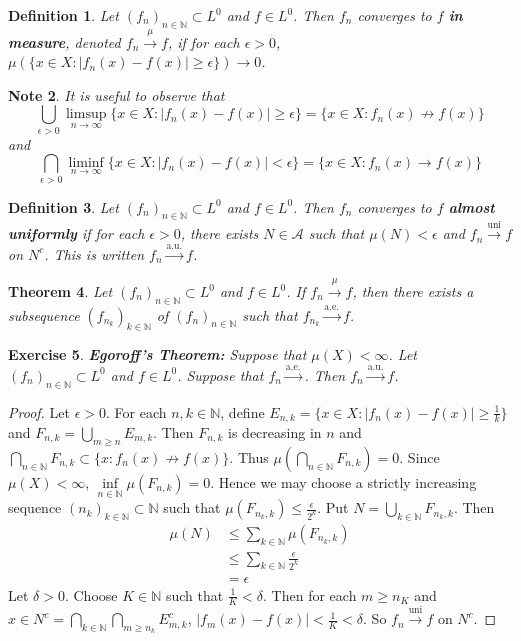 \documentclass[12pt]{amsart}
\newtheorem{thm}{Theorem}[subsection]
\newtheorem{defn}[thm]{Definition}
\newtheorem{note}[thm]{Note}
\newtheorem{ex}[thm]{Exercise}
\newcommand{\del}{\delta}
\newcommand{\ep}{\epsilon}
\newcommand{\N}{\mathbb{N}}
\newcommand{\MA}{\mathcal{A}}
\newcommand{\convt}[1]{\xrightarrow{\text{#1}}}
\begin{document}
	\begin{defn}
		Let $(f_n)_{n \in \N} \subset L^0$ and $f \in L^0$. Then $f_n$ converges to $f$ \textbf{in measure}, denoted $f_n \xrightarrow{\mu} f$, if for each $\ep > 0$, $\mu(\{x \in X: |f_n(x) - f(x)| \geq \ep \}) \rightarrow 0$.
	\end{defn}
	
	\begin{note}
		It is useful to observe that $$\bigcup_{\ep >0}\limsup\limits_{n \rightarrow \infty} \{x \in X: |f_n(x) - f(x)| \geq \ep \} = \{x \in X: f_n(x) \not \rightarrow f(x) \}$$ and $$\bigcap_{\ep > 0} \liminf_{n \rightarrow \infty}\{x \in X: |f_n(x) - f(x)| < \ep \} = \{x \in X: f_n(x) \rightarrow f(x) \}$$ 
	\end{note}
	
	\begin{defn}
		Let $(f_n)_{n \in \N} \subset L^0$ and $f \in L^0$. Then $f_n$ converges to $f$ \textbf{almost uniformly} if for each $\ep >0$, there exists $N \in \MA$ such that $\mu(N) < \ep$ and $f_n \xrightarrow{\text{uni}} f$ on $N^c$. This is written $f_n \xrightarrow{\text{a.u.}} f$.
	\end{defn}
	
	\begin{thm}
		Let $(f_n)_{n \in \N} \subset L^0$ and $f \in L^0$. If $f_n \xrightarrow{\mu} f$, then there exists a subsequence $(f_{n_k})_{k \in \N}$ of $(f_n)_{n \in \N}$ such that $f_{n_k} \xrightarrow{\text{a.e.}} f$.
	\end{thm}
	
	\begin{ex}\textbf{Egoroff's Theorem:}
		Suppose that $\mu(X) < \infty$. Let $(f_n)_{n \in \N} \subset L^0$ and $f \in L^0$. Suppose that $f_n \xrightarrow{\text{a.e.}}$. Then $f_n \xrightarrow{\text{a.u.}}f$.
	\end{ex}
	
	\begin{proof}
		Let $\ep >0$. For each $n, k \in \N$, define $E_{n, k} = \{x \in X: \vert f_n(x) - f(x) \vert \geq \frac{1}{k} \}$ and $F_{n,k} = \bigcup\limits_{m \geq n}E_{m,k}$. Then $F_{n,k}$ is decreasing in $n$ and $\bigcap\limits_{n \in \N}F_{n,k} \subset \{x: f_n(x) \not \rightarrow f(x)\}$. Thus $\mu(\bigcap\limits_{n \in \N}F_{n,k}) = 0$. Since $\mu(X) < \infty$, $\inf\limits_{n \in \N}\mu(F_{n,k}) = 0$. Hence we may choose a strictly increasing sequence $(n_k)_{k \in \N} \subset \N$ such that  $\mu(F_{n_k,k}) \leq \frac{\ep}{2^{k}}$. Put $N = \bigcup\limits_{k \in \N}F_{n_k,k}$. Then 
		\begin{align*}
			\mu(N) 
			&\leq \sum\limits_{k \in \N}\mu(F_{n_k,k}) \\
			& \leq \sum\limits_{k \in \N} \frac{\ep}{2^k}\\
			& = \ep
		\end{align*} 
		Let $\del > 0$. Choose $K \in \N$ such that $\frac{1}{K} < \del$. Then for each $m \geq n_K$ and $x \in N^c =\bigcap\limits_{k \in \N}\bigcap\limits_{m \geq n_k}E_{m,k}^c$, $|f_m(x)- f(x)| < \frac{1}{K} < \del$. So $f_n \convt{uni} f$ on $N^c$. 
	\end{proof}
	
\end{document}
